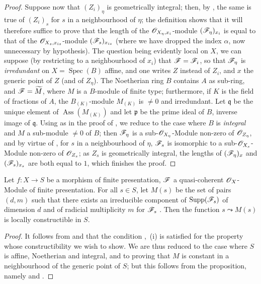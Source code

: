 \begin{proof}
Suppose now that $(Z_i)_\eta$ is geometrically integral; then, by , the same is true of $(Z_i)_s$ for $s$ in a neighbourhood of $\eta$; the definition  shows that it will therefore suffice to prove that the length of the $\mathscr{O}_{X_\eta,x_i}$-module $(\mathscr{F}_\eta)_{x_i}$ is equal to that of the $\mathscr{O}_{X_s,x_{is}}$-module $(\mathscr{F}_s)_{x_{is}}$ (where we have dropped the index $\alpha$, now unnecessary by hypothesis).
The question being evidently local on $X$, we can suppose (by restricting to a neighbourhood of $x_i$) that $\mathscr{F}=\mathscr{F}_i$, so that $\mathscr{F}_\eta$ is \emph{irredundant} on $X=\operatorname{Spec}(B)$ affine, and one writes $Z$ instead of $Z_i$, and $x$ the generic point of $Z$ (and of $Z_\eta$).
The Noetherian ring $B$ contains $A$ as sub-ring, and $\mathscr{F}=\widetilde{M}$, where $M$ is a $B$-module of finite type; furthermore, if $K$ is the field of fractions of $A$, the $B_{(K)}$-module $M_{(K)}$ is $\neq 0$ and irredundant.
Let $\mathfrak{q}$ be the unique element of $\operatorname{Ass}(M_{(K)})$ and let $\mathfrak{p}$ be the prime ideal of $B$, inverse image of $\mathfrak{q}$.
Using  as in the proof of , we reduce to the case where $B$ is \emph{integral} and $M$ a sub-module $\neq 0$ of $B$; then $\mathscr{F}_\eta$ is a sub-$\mathscr{O}_{X_\eta}$-Module non-zero of $\mathscr{O}_{Z_\eta}$, and by virtue of , for $s$ in a neighbourhood of $\eta$, $\mathscr{F}_s$ is isomorphic to a sub-$\mathscr{O}_{X_s}$-Module non-zero of $\mathscr{O}_{Z_s}$; as $Z_s$ is geometrically integral, the lengths of $(\mathscr{F}_\eta)_x$ and $(\mathscr{F}_s)_{x_s}$ are both equal to $1$, which finishes the proof.
\end{proof}

\begin{corollary}[9.8.7]
\label{IV.9.8.7}
Let $f:X\to S$ be a morphism of finite presentation, $\mathscr{F}$ a quasi-coherent $\mathscr{O}_X$-Module of finite presentation.
For all $s\in S$, let $M(s)$ be the set of pairs $(d,m)$ such that there exists an irreducible component of $\operatorname{Supp}(\mathscr{F}_s)$ of dimension $d$ and of radicial multiplicity $m$ for $\mathscr{F}_s$ .
Then the function $s\leadsto M(s)$ is locally constructible in $S$.
\end{corollary}

\begin{proof}
\label{IV.9.8.7-proof}
It follows from  and  that the condition ,~(i) is satisfied for the property whose constructibility we wish to show.
We are thus reduced to the case where $S$ is affine, Noetherian and integral, and to proving that $M$ is constant in a neighbourhood of the generic point of $S$; but this follows from the proposition, namely  and .
\end{proof}

